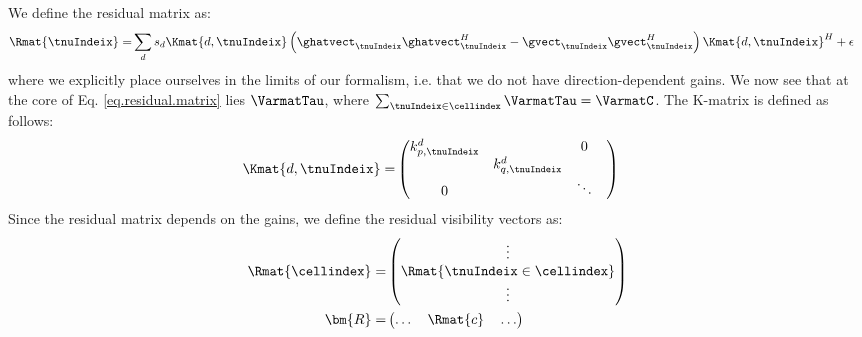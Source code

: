 \pg
We define the residual matrix as:
\begin{align}
\Rmat{\tnuIndeix} =& \sum_d s_d \Kmat{d,\tnuIndeix} \left( \ghatvect_\tnuIndeix\ghatvect_\tnuIndeix^H - \gvect_\tnuIndeix\gvect_\tnuIndeix^H \right) \Kmat{d,\tnuIndeix}^H + \epsilon \label{eq.residual.matrix}
\end{align}
where we {explicitly place ourselves in the limits of our formalism, i.e.} that we do not have direction-dependent gains. We now see that at the core of Eq. \ref{eq.residual.matrix} lies $\displaystyle\VarmatTau$, where $\sum_{\tnuIndeix\in\cellindex} \VarmatTau = \VarmatC$.
The K-matrix is defined as follows:
\begin{align}\label{kmat.def}
\Kmat{d,\tnuIndeix} =&
\begin{pmatrix}
k_{p,\tnuIndeix}^{d}   &                       &   0     &\\
                       & k_{q,\tnuIndeix}^{d}  &        &\\ 
         0              &                       & \ddots 
\end{pmatrix}
\end{align}
Since the residual matrix depends on the gains, we define the residual visibility vectors as:
\begin{align}
\Rmat{{\cellindex}} =&   \begin{pmatrix} \vdots \\ \Rmat{\tnuIndeix\in \cellindex} \\ \vdots \end{pmatrix} \\
\bm{R} =&   \begin{pmatrix} \hdots \quad \Rmat{c} \quad \hdots \end{pmatrix}
\end{align}


